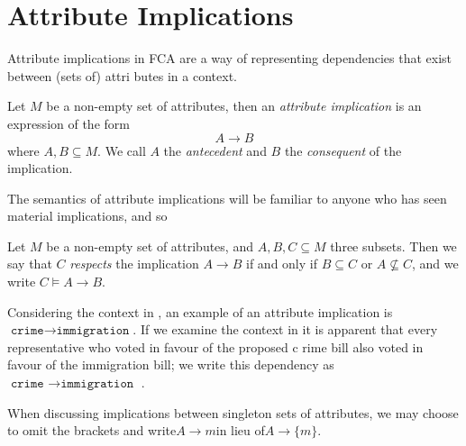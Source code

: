 \section{Attribute Implications}
\label{section:attribute-implications}Attribute implications in FCA are a way of representing dependencies that exist between (sets of)
attri butes in a context.
\begin{definition}
  \label{definition:attribute-implication} Let $M$ be a non-empty set of attributes, then an \emph{attribute implication} is an expression of
  the form
  \[
    A \rightarrow B
  \]
  where $A,B \subseteq M$. We call $A$ the \emph{antecedent} and $B$ the \emph{consequent} of the implication.
\end{definition}
The semantics of attribute implications will be familiar to anyone who has seen material implications, and so
\begin{definition}
  \label{definition:attribute-implication-semantics} Let $M$ be a non-empty set of attributes, and $A,B,C \subseteq M$ three subsets. Then we
  say that $C$ \emph{respects} the implication $A \rightarrow B$ if and only if $B \subseteq C$ or $A \not \subseteq C$, and we write $C \vDash
  A \rightarrow B$.
\end{definition}
Considering the context in , an example of an attribute implication is$\texttt{crime}\rightarrow \texttt{immigration
}$. If we examine the context in it is apparent that every representative who voted in favour of the proposed c
rime bill also voted in favour of the immigration bill; we write this dependency as$\texttt{crime }\rightarrow \texttt{immigration }$.

When discussing implications between singleton sets of attributes, we may choose to omit the brackets and write$A \rightarrow m$in lieu of$A
\rightarrow \{m\}$.


